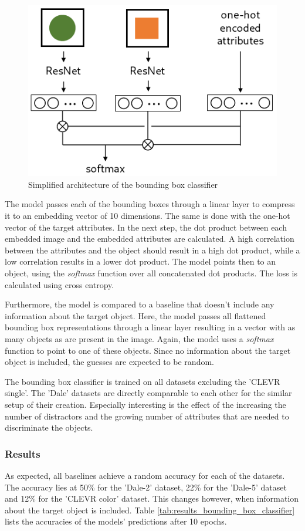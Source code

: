 \begin{figure}[h]
    \centering
    \includegraphics[width=.5\linewidth]{figures/arch_bounding_box_classifier.png}
    \caption{Simplified architecture of the bounding box classifier}
    \label{fig:bounding_box_classifier_architecture}
\end{figure}

The model passes each of the bounding boxes through a linear layer to compress it to an embedding vector of 10 dimensions.
The same is done with the one-hot vector of the target attributes.
In the next step, the dot product between each embedded image and the embedded attributes are calculated.
A high correlation between the attributes and the object should result in a high dot product, while a low correlation results in a lower dot product.
The model points then to an object, using the \emph{softmax} function over all concatenated dot products.
The loss is calculated using cross entropy.

Furthermore, the model is compared to a baseline that doesn't include any information about the target object.
Here, the model passes all flattened bounding box representations through a linear layer resulting in a vector with as many objects as are present in the image.
Again, the model uses a \emph{softmax} function to point to one of these objects.
Since no information about the target object is included, the guesses are expected to be random.

The bounding box classifier is trained on all datasets excluding the 'CLEVR single'.
The 'Dale' datasets are directly comparable to each other for the similar setup of their creation.
Especially interesting is the effect of the increasing the number of distractors and the growing number of attributes that are needed to discriminate the objects.

\subsubsection*{Results}
As expected, all baselines achieve a random accuracy for each of the datasets.
The accuracy lies at 50\% for the 'Dale-2' dataset, 22\% for the 'Dale-5' dataset and 12\% for the 'CLEVR color' dataset.
This changes however, when information about the target object is included.
Table \ref{tab:results_bounding_box_classifier} lists the accuracies of the models' predictions after 10 epochs.

